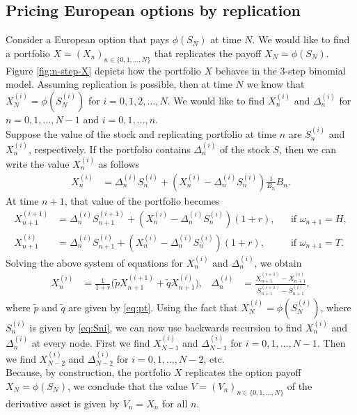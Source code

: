 \documentclass[12pt]{book}
\numberwithin{equation}{chapter}
\theoremstyle{plain}
\numberwithin{theorem}{section}
\theoremstyle{definition}
\numberwithin{exercise}{chapter}
\newcommand{\<}{\langle}
\renewcommand{\>}{\rangle}
\renewcommand{\(}{\left(}
\renewcommand{\)}{\right)}
\renewcommand{\[}{\left[}
\renewcommand{\]}{\right]}
\newcommand\om{\omega}
\newcommand\Del{\Delta}
\newcommand\qt{\widetilde{q}}
\theoremstyle{definition}
\numberwithin{question}{section}
\newcommand\pt{\widetilde{p}}
\begin{document}
\subsection{Pricing  European options by replication}
\label{sec:replication2}
Consider a European option that pays $\phi(S_N)$ at time $N$.
We would like to find a portfolio $X = (X_n)_{n \in \{0,1,\ldots,N\}}$ that replicates the payoff $X_N = \phi(S_N)$.  
Figure \ref{fig:n-step-X} depicts how the portfolio $X$ behaves in the 3-step binomial model.
Assuming replication is possible, then at time $N$ we know that $X_N^{(i)} = \phi(S_N^{(i)})$ for $i=0,1,2, \ldots,N$.  We would like to find $X_n^{(i)}$ and $\Del_n^{(i)}$ for $n=0,1,\ldots, N-1$ and $i=0,1,\ldots,n$.
\\[0.5em]
Suppose the value of the stock and replicating portfolio at time $n$ are $S_n^{(i)}$ and $X_n^{(i)}$, respectively.  If the portfolio contains $\Del_n^{(i)}$ of the stock $S$, then we can write the value $X_n^{(i)}$ as follows
\begin{align}
X_n^{(i)}
	&=	\Del_n^{(i)} S_n^{(i)} + (X_n^{(i)} - \Del_n^{(i)} S_n^{(i)}) \frac{1}{B_n} B_n .
\end{align}
At time $n+1$, that value of the portfolio becomes
\begin{align}
X_{n+1}^{(i+1)} 
	&=	\Del_n^{(i)} S_{n+1}^{(i+1)} + (X_n^{(i)} - \Del_n^{(i)} S_n^{(i)}) (1+r) , && \text{if $\om_{n+1}=H$}, \\
X_{n+1}^{(i)}
	&=	\Del_n^{(i)} S_{n+1}^{(i)} + (X_n^{(i)} - \Del_n^{(i)} S_n^{(i)}) (1+r) , && \text{if $\om_{n+1}=T$}.
\end{align}
Solving the above system of equations for $X_n^{(i)}$ and $\Del_n^{(i)}$, we obtain
\begin{align}
X_n^{(i)}
	&=	\frac{1}{1+r} \Big( \pt X_{n+1}^{(i+1)} + \qt X_{n+1}^{(i)} \Big), &
\Del_n^{(i)}
	&=	\frac{X_{n+1}^{(i+1)} - X_{n+1}^{(i)}}{S_{n+1}^{(i+1)} - S_{n+1}^{(i)} } , \label{eq:portfolio_n}
\end{align}
where $\pt$ and $\qt$ are given by \eqref{eq:pt}.
Using the fact that $X_N^{(i)} = \phi(S_N^{(i)})$, where $S_n^{(i)}$ is given by \eqref{eq:Sni}, we can now use backwards recursion to find $X_n^{(i)}$ and $\Del_n^{(i)}$ at every node.  First we find $X_{N-1}^{(i)}$ and $\Del_{N-1}^{(i)}$ for $i = 0, 1, \ldots, N-1$.  Then we find $X_{N-2}^{(i)}$ and $\Del_{N-2}^{(i)}$ for $i = 0, 1, \ldots, N-2$, etc.  
\\[0.5em]
Because, by construction, the portfolio $X$ replicates the option payoff $X_N = \phi(S_N)$, we conclude that the value $V = (V_n)_{n \in \{0, 1, \ldots, N\}}$ of the derivative asset is given by $V_n = X_n$ for all $n$.  
\end{document}
